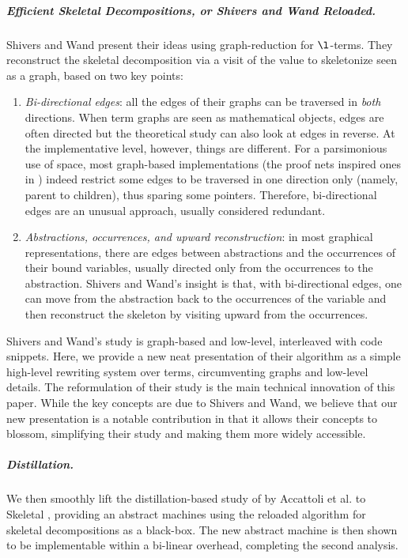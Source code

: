 \subparagraph{Efficient Skeletal Decompositions, or Shivers and Wand Reloaded.} Shivers and Wand present their ideas using graph-reduction for $\l$-terms. They reconstruct the skeletal decomposition via a visit of the value to skeletonize seen as a graph, based on two key points:
\begin{enumerate}
\item \emph{Bi-directional edges}: all the edges of their graphs can be traversed in \emph{both} directions. When term graphs are seen as mathematical objects, edges are often directed but the theoretical study can also look at edges in reverse. At the implementative level, however, things are different. For a parsimonious use of space, most graph-based implementations (\eg the proof nets inspired ones in \cite{DBLP:conf/ppdp/AccattoliB17,DBLP:conf/lics/AccattoliCC21,DBLP:conf/fscd/AccattoliC24}) indeed restrict some edges to be traversed in one direction only (namely, parent to children), thus sparing some pointers. Therefore, bi-directional edges are an unusual approach, usually considered redundant.

\item \emph{Abstractions, occurrences, and upward reconstruction}: in most graphical representations, there are edges between abstractions and the occurrences of their bound variables, usually directed only from the occurrences to the abstraction. Shivers and Wand's insight is that, with bi-directional edges, one can move from the abstraction back to the occurrences of the variable and then reconstruct the skeleton by visiting upward from the occurrences.
\end{enumerate}
Shivers and Wand's study is graph-based and low-level, interleaved with code snippets. 
Here, we provide a new neat presentation of their algorithm as a simple high-level rewriting system over terms, circumventing graphs and low-level details. The reformulation of their study is the main technical innovation of this paper. While the key concepts are due to Shivers and Wand, we believe that our new presentation is a notable contribution in that it allows their concepts to blossom, simplifying their study and making them more widely accessible. 


\subparagraph{Distillation.} We then smoothly lift the distillation-based study of \cbneed by Accattoli et al. \cite{DBLP:conf/icfp/AccattoliBM14} to Skeletal \cbneed, providing an abstract machines using the reloaded  algorithm for skeletal decompositions as a black-box. The new abstract machine is then shown to be implementable within a bi-linear overhead, completing the second analysis.

